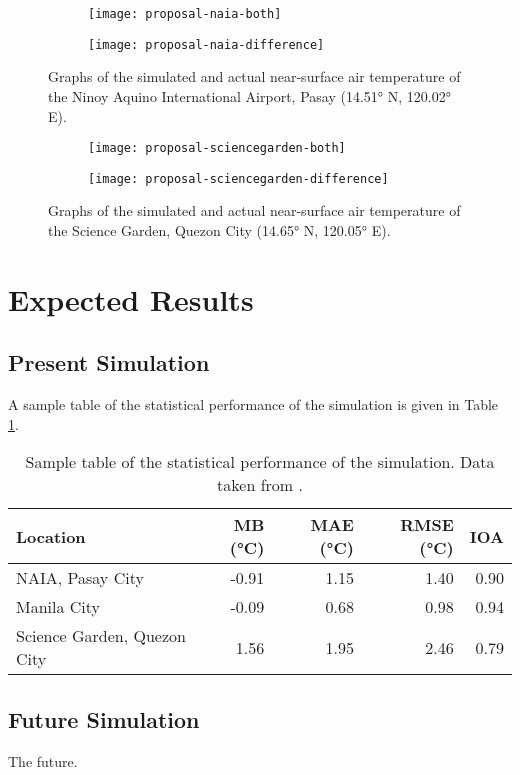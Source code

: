 	\begin{figure}
		\centering
		\begin{subfigure}{\textwidth}
			\texttt{[image: proposal-naia-both]}
		\end{subfigure}
		\begin{subfigure}{\textwidth}
			\texttt{[image: proposal-naia-difference]}
		\end{subfigure}
		\caption{
			Graphs of the simulated and actual near-surface air temperature of the Ninoy Aquino International Airport, Pasay (\ang{14.51} N, \ang{120.02} E).
		}
		\label{fig:proposal-naia-results}
	\end{figure}

	\begin{figure}
		\centering
		\begin{subfigure}{\textwidth}
			\texttt{[image: proposal-sciencegarden-both]}
		\end{subfigure}
		\begin{subfigure}{\textwidth}
			\texttt{[image: proposal-sciencegarden-difference]}
		\end{subfigure}
		\caption{
			Graphs of the simulated and actual near-surface air temperature of the Science Garden, Quezon City (\ang{14.65} N, \ang{120.05} E).
		}
		\label{fig:proposal-sciencegarden-results}
	\end{figure}

\section{Expected Results}
	\subsection{Present Simulation}
		A sample table of the statistical performance of the simulation is given in Table \ref{tab:sample-statistical-performance}.

		\begin{table}[]
			\caption{
				Sample table of the statistical performance of the simulation.
				Data taken from \textcite{Bilang2022}.
			}
			\label{tab:sample-statistical-performance}
			\centering
			\begin{tabular}{lrrrr}
				\hline \hline
				Location                    & MB (\unit{\degreeCelsius})    & MAE (\unit{\degreeCelsius}) & RMSE (\unit{\degreeCelsius}) & IOA \\
				\hline
				NAIA, Pasay City            & -0.91 & 1.15 & 1.40 & 0.90 \\
				Manila City                 & -0.09 & 0.68 & 0.98 & 0.94 \\
				Science Garden, Quezon City & 1.56  & 1.95 & 2.46 & 0.79 \\
				\hline
			\end{tabular}
		\end{table}

	\subsection{Future Simulation}
		The future.
